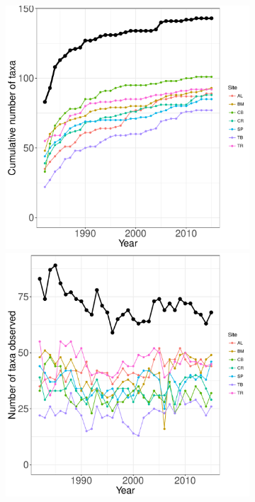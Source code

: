 \documentclass[11pt, oneside]{article}
\begin{document}
\begin{figure}[h!]
\begin{figure}[h!]
\centering
\includegraphics[scale = 0.4]{ntl-zooplankton-stanleyLottig_species_accumulation_curve.pdf}
\includegraphics[scale = 0.4]{ntl-zooplankton-stanleyLottig_num_taxa_over_time.pdf}

\end{figure}
\end{figure}
\end{document}
